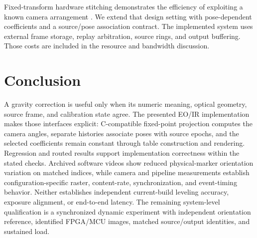 \documentclass[journal]{IEEEtran}
\begin{document}
Fixed-transform hardware stitching demonstrates the efficiency of exploiting a known camera arrangement \cite{suk2015hwstitch}. We extend that design setting with pose-dependent coefficients and a source/pose association contract. The implemented system uses external frame storage, replay arbitration, source rings, and output buffering. Those costs are included in the resource and bandwidth discussion.









\section{Conclusion}
A gravity correction is useful only when its numeric meaning, optical geometry, source frame, and calibration state agree. The presented EO/IR implementation makes those interfaces explicit: C-compatible fixed-point projection computes the camera angles, separate histories associate poses with source epochs, and the selected coefficients remain constant through table construction and rendering. Regression and routed results support implementation correctness within the stated checks. Archived software videos show reduced physical-marker orientation variation on matched indices, while camera and pipeline measurements establish configuration-specific raster, content-rate, synchronization, and event-timing behavior. Neither establishes independent current-build leveling accuracy, exposure alignment, or end-to-end latency. The remaining system-level qualification is a synchronized dynamic experiment with independent orientation reference, identified FPGA/MCU images, matched source/output identities, and sustained load.



\end{document}
